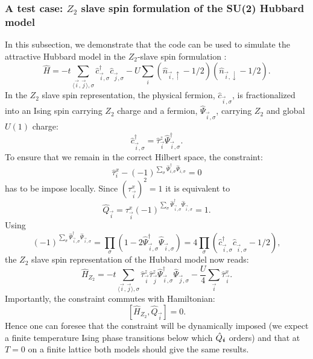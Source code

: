 \subsubsection{A test case: $Z_2$ slave spin formulation of the  SU(2)  Hubbard model }
In this subsection, we  demonstrate that the code can be used to  simulate the attractive Hubbard model in the  $Z_2$-slave spin formulation \cite{Ruegg10}:
\begin{equation}
        \hat{H} = -t \sum_{\langle \vec{i}, \vec{j} \rangle, \sigma }\hat{c}^{\dagger}_{\vec{i},\sigma} \hat{c}^{\phantom{\dagger}}_{\vec{j},\sigma}   -  U  \sum_i
        \left( \hat{n}_{\vec{i}, \uparrow} - 1/2\right)  \left( \hat{n}_{\vec{i}, \downarrow} - 1/2\right).
\end{equation}
In the $Z_2$ slave spin  representation, the physical fermion, $\hat{c}_{\vec{i},\sigma} $,   is fractionalized into  an Ising spin carrying $Z_2$ charge and a fermion, $\hat{\Psi}_{\vec{i},\sigma} $, carrying $Z_2$ and  global $U(1)$ charge:
\begin{equation}
        \hat{c}^{\dagger}_{\vec{i},\sigma}  = \hat{\tau}^{z}_{\vec{i}} \hat{\Psi}^{\dagger}_{\vec{i},\sigma}.
\end{equation}
To ensure that we remain in the correct Hilbert space, the constraint:
\begin{equation}
        \hat{\tau}^{x}_{i}   - (-1)^{\sum_{\sigma}\hat{\Psi}^{\dagger}_{i,\sigma}  \hat{\Psi}^{\phantom{\dagger}}_{i,\sigma}  }  = 0
\end{equation}
has to be impose locally. Since $\left(  \tau^{x}_{\vec{i}}\right)^2 = 1 $ it is   equivalent to
 \begin{equation}
        \hat{Q}_{\vec{i}} = \tau^{x}_{\vec{i}}  (-1)^{\sum_{\sigma}\hat{\Psi}^{\dagger}_{\vec{i},\sigma}  \hat{\Psi}^{\phantom{\dagger}}_{\vec{i},\sigma}  }   = 1.
 \end{equation}
 Using 
 \begin{equation}
 	(-1)^{\sum_{\sigma}\hat{\Psi}^{\dagger}_{\vec{i},\sigma}  \hat{\Psi}^{\phantom{\dagger}}_{\vec{i},\sigma}  }    = \prod_{\sigma} ( 1 - 2 \hat{\Psi}^{\dagger}_{\vec{i},\sigma}  \hat{\Psi}^{\phantom{\dagger}}_{\vec{i},\sigma} ) =  4\prod_{\sigma} ( \hat{c}^{\dagger}_{\vec{i},\sigma}  \hat{c}^{\phantom{\dagger}}_{\vec{i},\sigma}  - 1/2 ),
 \end{equation}
 the  $Z_2$ slave spin representation of  the Hubbard model now reads:
 \begin{equation}
         \hat{H}_{Z_2}= -t \sum_{\langle \vec{i}, \vec{j} \rangle, \sigma }  \hat{\tau}^{z}_{\vec{i}}  \hat{\tau}^{z}_{\vec{j}} \hat{\Psi}^{\dagger}_{\vec{i},\sigma} \hat{\Psi}^{\phantom{\dagger}}_{\vec{j},\sigma}   -  \frac{U}{4}  \sum_{\vec{i}}  \hat{\tau}^{x}_{\vec{i}}.
 \end{equation}
 Importantly, the constraint  commutes with Hamiltonian:
 \begin{equation}
        \left[ \hat{H}_{Z_2}, \hat{Q}_{\vec{i}} \right] = 0.
 \end{equation}
Hence  one can foresee that the constraint will be dynamically imposed (we expect a finite temperature Ising phase  transitions  below which $\hat{Q}_{\boldsymbol{i}} $  orders) and that at  $T=0$ on a finite lattice both models should give the same results.


